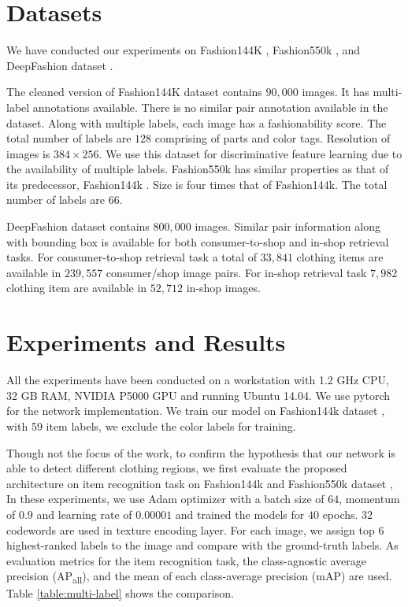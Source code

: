 \documentclass{article}
\begin{document}
\section{Datasets}

We have conducted our experiments on Fashion144K \cite{SimoSerraCVPR2016}, Fashion550k \cite{InoueICCVW2017}, and DeepFashion dataset \cite{LiuCVPR2016}.

The cleaned version of Fashion144K dataset \cite{SimoSerraCVPR2016} contains $90,000$ images. It has multi-label annotations available. There is no similar pair annotation available in the dataset. Along with multiple labels, each image has a fashionability score. The total number of labels are $128$ comprising of parts and color tags. Resolution of images is $384 \times 256$. We use this dataset for discriminative feature learning due to the availability of multiple labels. Fashion550k \cite{InoueICCVW2017} has similar properties as that of its predecessor, Fashion144k \cite{SimoSerraCVPR2016}. Size is four times that of Fashion144k. The total number of labels are $66$.

DeepFashion dataset \cite{LiuCVPR2016} contains $800,000$ images. Similar pair information along with bounding box is available for both consumer-to-shop and in-shop retrieval tasks. For consumer-to-shop retrieval task a total of $33,841$ clothing items are available in $239,557$ consumer/shop image pairs. For in-shop retrieval task $7,982$ clothing item are available in $52,712$ in-shop images.

\section{Experiments and Results}

All the experiments have been conducted on a workstation with 1.2 GHz CPU, 32 GB RAM, NVIDIA P5000 GPU and running Ubuntu 14.04. We use pytorch for the network implementation. We train our model on Fashion144k dataset \cite{SimoSerraCVPR2016}, with 59 item labels, we exclude the color labels for training.

Though not the focus of the work, to confirm the hypothesis that our network is able to detect different clothing regions, we first evaluate the proposed architecture on item recognition task on Fashion144k \cite{SimoSerraCVPR2016} and Fashion550k dataset \cite{InoueICCVW2017}, In these experiments, we use Adam optimizer with a batch size of $64$, momentum of $0.9$ and learning rate of $0.00001$ and trained the models for $40$ epochs. $32$ codewords are used in texture encoding layer. For each image, we assign top $6$ highest-ranked labels to the image and compare with the ground-truth labels. As evaluation metrics for the item recognition task, the class-agnostic average precision (AP\textsubscript{all}), and the mean of each class-average precision (mAP) are used. Table \ref{table:multi-label} shows the comparison.
\end{document}
